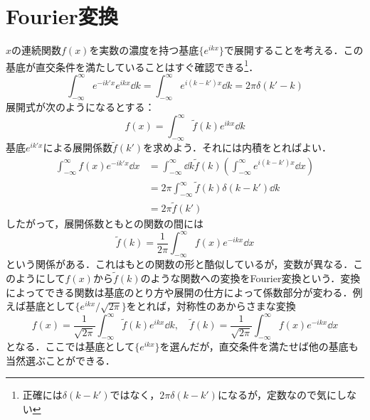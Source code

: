 \documentclass[a4paper,10pt,uplatex]{jsarticle}
\newcommand{\intall}{\int_{-\infty}^{\infty}}
\begin{document}
\section{Fourier変換}
$x$の連続関数$f(x)$を実数の濃度を持つ基底$\{e^{ikx}\}$で展開することを考える．この基底が直交条件を満たしていることはすぐ確認できる\footnote{正確には$\delta(k-k')$ではなく，$2\pi\delta(k-k')$になるが，定数なので気にしない}．
\begin{equation}
    \int_{-\infty}^{\infty} e^{-ik'x} e^{ikx} \dd{k} = \int_{-\infty}^{\infty} e^{i(k-k')x} \dd{k} = 2\pi\delta(k' - k)
\end{equation}
展開式が次のようになるとする：
\begin{equation}
    f(x) = \int_{-\infty}^{\infty} \tilde{f}(k) e^{ikx} \dd{k}
\end{equation}
基底$e^{ik'x}$による展開係数$\tilde{f}(k')$を求めよう．それには内積をとればよい．
\begin{align}
    \int_{-\infty}^{\infty} f(x) e^{-ik'x} \dd{x} &= \intall \dd{k} \tilde{f}(k) \left( \intall e^{i(k-k')x} \dd{x} \right) \\
    &= 2\pi \intall \tilde{f}(k) \delta(k-k') \dd{k} \\
    &= 2\pi \tilde{f}(k')
\end{align}
したがって，展開係数ともとの関数の間には
\begin{equation}
    \tilde{f}(k) = \frac{1}{2\pi} \intall f(x) e^{-ikx} \dd{x}
\end{equation}
という関係がある．これはもとの関数の形と酷似しているが，変数が異なる．このようにして$f(x)$から$\tilde{f}(k)$のような関数への変換をFourier変換という．変換によってできる関数は基底のとり方や展開の仕方によって係数部分が変わる．例えば基底として$\{e^{ikx}/\sqrt{2\pi}\}$をとれば，対称性のあからさまな変換
\begin{equation}
    f(x) = \frac{1}{\sqrt{2\pi}} \intall \tilde{f}(k) e^{ikx} \dd{k}, \quad \tilde{f}(k) = \frac{1}{\sqrt{2\pi}} \intall f(x) e^{-ikx} \dd{x}
\end{equation}
となる．ここでは基底として$\{e^{ikx}\}$を選んだが，直交条件を満たせば他の基底も当然選ぶことができる．
\end{document}
